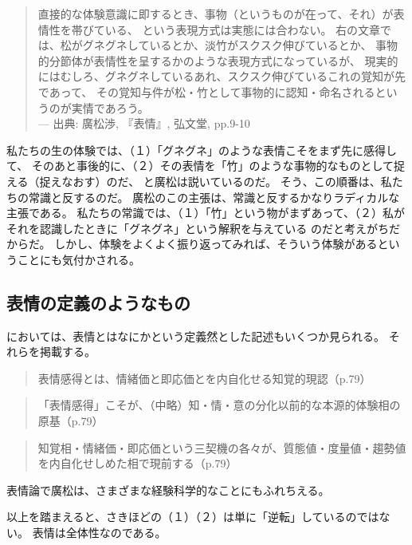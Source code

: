 \begin{quotation}
  直接的な体験意識に即するとき、事物（というものが在って、それ）が表情性を帯びている、 
  という表現方式は実態には合わない。
  右の文章では、松がグネグネしているとか、淡竹がスクスク伸びているとか、
  事物的分節体が表情性を呈するかのような表現方式になっているが、
  現実的にはむしろ、グネグネしているあれ、スクスク伸びているこれの覚知が先であって、
  その覚知与件が松・竹として事物的に認知・命名されるというのが実情であろう。 \\
  --- 出典: 廣松渉, 『表情』, 弘文堂, pp.9-10
\end{quotation}
私たちの生の体験では、（１）「グネグネ」のような表情こそをまず先に感得して、
そのあと事後的に、（２）その表情を「竹」のような事物的なものとして捉える（捉えなおす）のだ、
と廣松は説いているのだ。
そう、この順番は、私たちの常識と反するのだ。
廣松のこの主張は、常識と反するかなりラディカルな主張である。
私たちの常識では、（１）「竹」という物がまずあって、（２）私がそれを認識したときに「グネグネ」という解釈を与えている
のだと考えがちだからだ。
しかし、体験をよくよく振り返ってみれば、そういう体験があるということにも気付かされる。

\subsection{表情の定義のようなもの}
\cite{hiromatsu:1989}においては、表情とはなにかという定義然とした記述もいくつか見られる。
それらを掲載する。
\begin{quote}
  表情感得とは、情緒価と即応価とを内自化せる知覚的現認（p.79）
\end{quote}
\begin{quote}
  「表情感得」こそが、（中略）知・情・意の分化以前的な本源的体験相の原基（p.79）
\end{quote}
\begin{quote}
  知覚相・情緒価・即応価という三契機の各々が、質態値・度量値・趨勢値を内自化せしめた相で現前する（p.79）
\end{quote}
表情論で廣松は、さまざまな経験科学的なことにもふれちえる。

以上を踏まえると、さきほどの（１）（２）は単に「逆転」しているのではない。
表情は全体性なのである。

